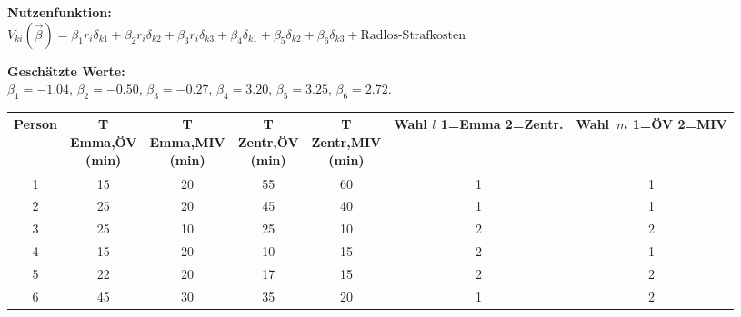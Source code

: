 \documentclass[a4paper]{foils}
\begin{document}
\begin{landscape}
\begin{center}
\newpage
\vspace{-0.5em}
\vspace{-0.5em}
\parbox{1.2\textwidth}{{\small 
\textbf{Nutzenfunktion:}\\
$
V_{ki}(\vec{\beta})=\beta_1 r_{i}\delta_{k1}
+\beta_2 r_{i}\delta_{k2}
+\beta_3 r_{i}\delta_{k3}
+\beta_4\delta_{k1}+\beta_5\delta_{k2}
+\beta_6\delta_{k3}+\text{Radlos-Strafkosten}
$

\textbf{Gesch\"atzte Werte:} \\
$\beta_1=-1.04$, $\beta_2=-0.50$, $\beta_3=-0.27$,
$\beta_4=3.20$, $\beta_5=3.25$, $\beta_6=2.72$. 
}
}



\newpage
\vspace{1em}

{\small
\begin{tabular}{|c||c|c|c|c||c|c|} \hline
Person 
 & \myBox{4.5em}{T\\Emma,\"OV\\(min)}
 & \myBox{4.5em}{T\\Emma,MIV\\(min)}
 & \myBox{4.5em}{T\\Zentr,\"OV\\(min)}
 & \myBox{4.5em}{T\\Zentr,MIV\\(min)}
 & \myBox{3.5em}{Wahl $l$\\1=Emma\\2=Zentr.}
 & \myBox{3em}{Wahl~$m$\\1=\"OV\\2=MIV} \\ \hline
1 & 15 & 20 & 55 & 60 & 1 & 1 \\
2 & 25 & 20 & 45 & 40 & 1 & 1 \\
3 & 25 & 10 & 25 & 10 & 2 & 2 \\
4 & 15 & 20 & 10 & 15 & 2 & 1 \\
5 & 22 & 20 & 17 & 15 & 2 & 2 \\
6 & 45 & 30 & 35 & 20 & 1 & 2 \\ \hline
\end{tabular}
}
\vspace{1em}


\end{center}
\end{landscape}
\end{document}
